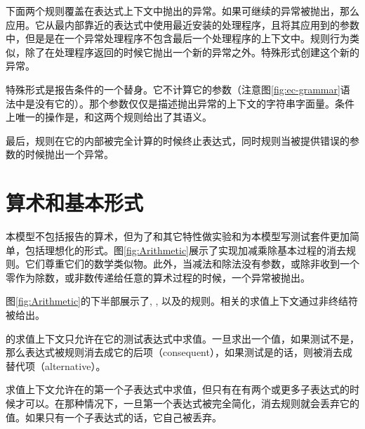 下面两个规则覆盖在表达式上下文中抛出的异常。如果可继续的异常被抛出，那么应用。它从最内部靠近的表达式中使用最近安装的处理程序，且将其应用到的参数中，但是是在一个异常处理程序不包含最后一个处理程序的上下文中。规则行为类似，除了在处理程序返回的时候它抛出一个新的异常之外。特殊形式创建这个新的异常。

\beginfig
\begin{center}

\end{center}
\caption{Eqv等价}\label{fig:Eqv}
\endfig

特殊形式是报告条件的一个替身。它不计算它的参数（注意图\ref{fig:ec-grammar}语法中是没有它的）。那个参数仅仅是描述抛出异常的上下文的字符串字面量。条件上唯一的操作是，和这两个规则给出了其语义。

最后，规则在它的内部被完全计算的时候终止表达式，同时规则当被提供错误的参数的时候抛出一个异常。

\section{算术和基本形式}

本模型不包括报告的算术，但为了和其它特性做实验和为本模型写测试套件更加简单，包括理想化的形式。图\ref{fig:Arithmetic}展示了实现加减乘除基本过程的消去规则。它们尊重它们的数学类似物。此外，当减法和除法没有参数，或除非收到一个零作为除数，或非数传递给任意的算术过程的时候，一个异常被抛出。

图\ref{fig:Arithmetic}的下半部展示了, , 以及的规则。相关的求值上下文通过非终结符被给出。

的求值上下文只允许在它的测试表达式中求值。一旦求出一个值，如果测试不是\semfalse{}，那么表达式被规则消去成它的后项（consequent），如果测试是\semfalse{}的话，则被消去成替代项（alternative）。

求值上下文允许在的第一个子表达式中求值，但只有在有两个或更多子表达式的时候才可以。在那种情况下，一旦第一个表达式被完全简化，消去规则就会丢弃它的值。如果只有一个子表达式的话，它自己被丢弃。

\subfigurestart{}
\beginfig
\begin{center}

\end{center}
\caption{过程\&应用}\label{fig:Procedure--application}
\endfig

